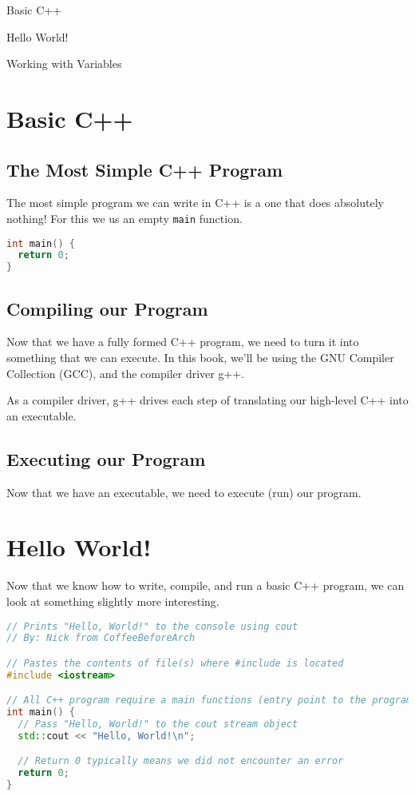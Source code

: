 \documentclass[11pt,fancy,authoryear]{elegantbook}
\begin{document}
\begin{introduction}
  \item Basic C++
  \item Hello World!
  \item Working with Variables
\end{introduction}

\section{Basic C++}

\subsection{The Most Simple C++ Program}

The most simple program we can write in C++ is a one that does absolutely nothing! For this we us an empty \lstinline{main} function.

\begin{lstlisting}[language=C++]
int main() {
  return 0;
}
\end{lstlisting}

\subsection{Compiling our Program}

Now that we have a fully formed C++ program, we need to turn it into something that we can execute. In this book, we'll be using the GNU Compiler Collection (GCC), and the compiler driver g++.

As a compiler driver, g++ drives each step of translating our high-level C++ into an executable.

\subsection{Executing our Program}

Now that we have an executable, we need to execute (run) our program.

\section{Hello World!}

Now that we know how to write, compile, and run a basic C++ program, we can look at something slightly more interesting.

\begin{lstlisting}[language=C++]
// Prints "Hello, World!" to the console using cout
// By: Nick from CoffeeBeforeArch

// Pastes the contents of file(s) where #include is located
#include <iostream>

// All C++ program require a main functions (entry point to the program)
int main() {
  // Pass "Hello, World!" to the cout stream object
  std::cout << "Hello, World!\n";

  // Return 0 typically means we did not encounter an error
  return 0;
}
\end{lstlisting}
\end{document}
